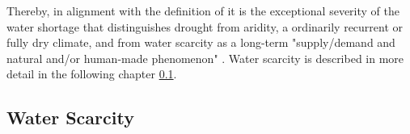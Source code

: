 {Thereby, in alignment with the definition of \autocite{vanloonDroughtHumanmodifiedWorld2016} it is the exceptional severity of the water shortage that distinguishes drought from aridity, a ordinarily recurrent or fully dry climate, and from water scarcity as a long-term "supply/demand and natural and/or human-made phenomenon" \autocites[7]{idmpDroughtWaterScarcity2022}{vereintenationenSpecialReportDrought2021, vanClimatologicalRiskDroughts2017}. Water scarcity is described in more detail in the following chapter \ref*{subsec:water_scarcity}.


\subsection{Water Scarcity}\label{subsec:water_scarcity}

}
